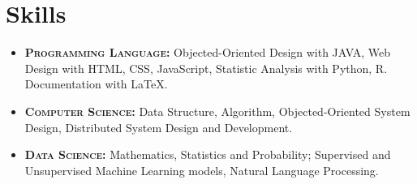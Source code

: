 \documentclass[letterpaper,11pt]{article}
\begin{document}
\section{Skills}
\begin{itemize}[align=left]\setlength\itemsep{0em}
  \item \textbf{\textsc{Programming Language:}} Objected-Oriented Design with JAVA, Web Design with HTML, CSS, JavaScript, Statistic Analysis with Python, R. Documentation with \LaTeX.
  \item \textbf{\textsc{Computer Science:}} Data Structure, Algorithm, Objected-Oriented System Design, Distributed System Design and Development.
  \item \textbf{\textsc{Data Science:}} Mathematics, Statistics and Probability; Supervised and Unsupervised Machine Learning models, Natural Language Processing.
\end{itemize}






\end{document}
